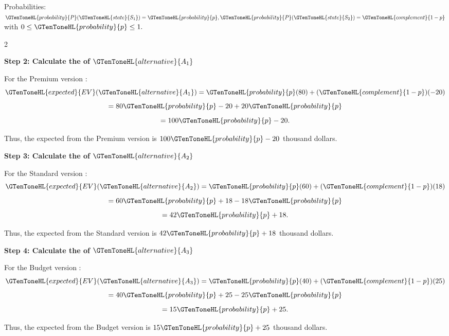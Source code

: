 	Probabilities:
	$
	\GTenToneHL{probability}{P}(\GTenToneHL{state}{S_1})=\GTenToneHL{probability}{p},
	\GTenToneHL{probability}{P}(\GTenToneHL{state}{S_2})=\GTenToneHL{complement}{1-p}
	$
	with
	$
	0\leq \GTenToneHL{probability}{p}\leq1.
	$
	
	\vspace{-3mm}
	
	\noindent
	\setlength{\columnseprule}{0.4pt}
	\begin{multicols}{2}
		\vspace{0pt}
		
		\textbf{Step 2: Calculate the   of $\GTenToneHL{alternative}{A_1}$}
		
		For the Premium version :
		\[
		\GTenToneHL{expected}{EV}(\GTenToneHL{alternative}{A_1})
		=
		\GTenToneHL{probability}{p}(80)
		+
		(\GTenToneHL{complement}{1-p})(-20)
		\]
		\[
		=
		80\GTenToneHL{probability}{p}-20+20\GTenToneHL{probability}{p}
		\]
		\[
		=
		100\GTenToneHL{probability}{p}-20.
		\]
		
		Thus, the expected  from the Premium version is
		$100\GTenToneHL{probability}{p}-20$ thousand dollars.
		
		\textbf{Step 3: Calculate the   of $\GTenToneHL{alternative}{A_2}$}
		
		For the Standard version :
		\[
		\GTenToneHL{expected}{EV}(\GTenToneHL{alternative}{A_2})
		=
		\GTenToneHL{probability}{p}(60)
		+
		(\GTenToneHL{complement}{1-p})(18)
		\]
		\[
		=
		60\GTenToneHL{probability}{p}+18-18\GTenToneHL{probability}{p}
		\]
		\[
		=
		42\GTenToneHL{probability}{p}+18.
		\]
		
		Thus, the expected  from the Standard version is
		$42\GTenToneHL{probability}{p}+18$ thousand dollars.
		
		\columnbreak
		
		\textbf{Step 4: Calculate the   of $\GTenToneHL{alternative}{A_3}$}
		
		For the Budget version :
		\[
		\GTenToneHL{expected}{EV}(\GTenToneHL{alternative}{A_3})
		=
		\GTenToneHL{probability}{p}(40)
		+
		(\GTenToneHL{complement}{1-p})(25)
		\]
		\[
		=
		40\GTenToneHL{probability}{p}+25-25\GTenToneHL{probability}{p}
		\]
		\[
		=
		15\GTenToneHL{probability}{p}+25.
		\]
		
		Thus, the expected  from the Budget version is
		$15\GTenToneHL{probability}{p}+25$ thousand dollars.
	\end{multicols}
	
